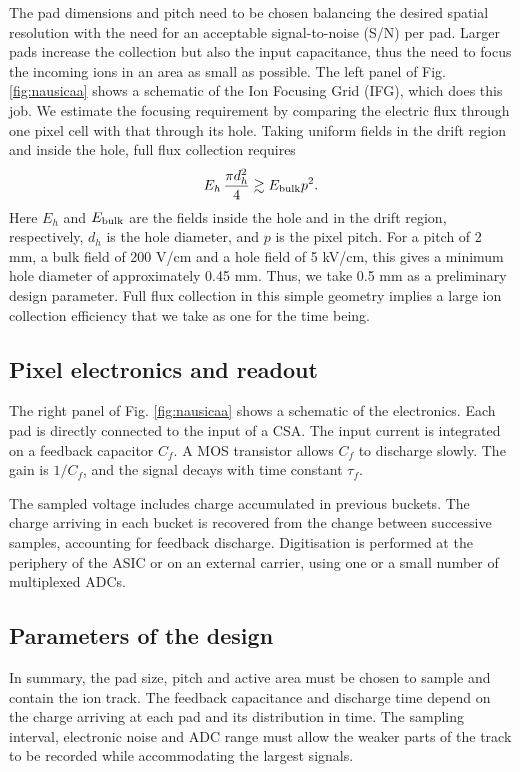 The pad dimensions and pitch need to be chosen balancing the desired spatial resolution with the need for an acceptable signal-to-noise (S/N) per pad. Larger pads increase the collection but also the input capacitance, thus the need to focus the incoming ions in an area as small as possible. The left panel of Fig. \ref{fig:nausicaa} shows a schematic of the Ion Focusing Grid (IFG), which does this job.  We estimate the focusing requirement by comparing the electric flux through one pixel cell with that through its hole. Taking uniform fields in the drift region and inside the hole, full flux collection requires
\[
E_h\,\frac{\pi d_h^2}{4}\gtrsim E_{\rm bulk}p^2.
\]
Here $E_h$ and $E_{\rm bulk}$ are the fields inside the hole and in the drift region, respectively, $d_h$ is the hole diameter, and $p$ is the pixel pitch.
For a pitch of 2 mm, a bulk field of 200 V/cm and a hole field of 5 kV/cm, this gives a minimum hole diameter of approximately 0.45 mm. Thus, we take 0.5 mm as a preliminary design parameter. Full flux collection in this simple geometry implies a large ion collection efficiency that we take as one for the time being.


\subsection{Pixel electronics and readout}

The right panel of Fig. \ref{fig:nausicaa} shows a schematic of the electronics. Each pad is directly connected to the input of a CSA. The input current is integrated on a feedback capacitor $C_f$. A MOS transistor allows $C_f$ to discharge slowly. The gain is  $1/C_{f}$, and the signal decays with time constant $\tau_{f}$.


The sampled voltage includes charge accumulated in previous buckets. The charge arriving in each bucket is recovered from the change between successive samples, accounting for feedback discharge. Digitisation is performed at the periphery of the ASIC or on an external carrier, using one or a small number of multiplexed ADCs.

\subsection{Parameters of the design}

In summary, the pad size, pitch and active area must be chosen to sample and contain the ion track. The feedback capacitance and discharge time depend on the charge arriving at each pad and its distribution in time. The sampling interval, electronic noise and ADC range must allow the weaker parts of the track to be recorded while accommodating the largest signals.


